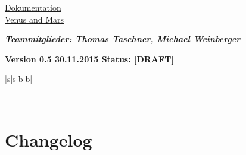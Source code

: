 \documentclass[12pt,a4paper,oneside,ngerman]{scrartcl}
\begin{document}
\thispagestyle{empty}
\vspace*{2cm}


\begin{center}
\begin{huge}
\renewcommand{\ULthickness}{2pt}
\uline{Dokumentation}
\\
\uline{Venus and Mars}
\end{huge}
\end{center}

\vspace{9cm}

\textit{\textbf{Teammitglieder: Thomas Taschner, Michael Weinberger}}
\vspace{10mm}

\textbf{{\color{g4}Version 0.5 \hfill 30.11.2015 \hfill Status: [DRAFT]}}
\\
\begin{table}[h]
\renewcommand{\arraystretch}{3.0}
\centering
\begin{tabularx}{\textwidth}{|s|s|b|b|}

\specialrule{0.07em}{0em}{0em}
 \\ \hline
\end{tabularx}
\end{table}
\newpage


\pagestyle{fancy}
\renewcommand{\headrulewidth}{0.4pt}
\renewcommand{\footrulewidth}{0.4pt}
\setlength\headheight{15pt}
\cfoot{}


\tableofcontents\thispagestyle{fancy}
\newpage


\section{Changelog}
\end{document}
